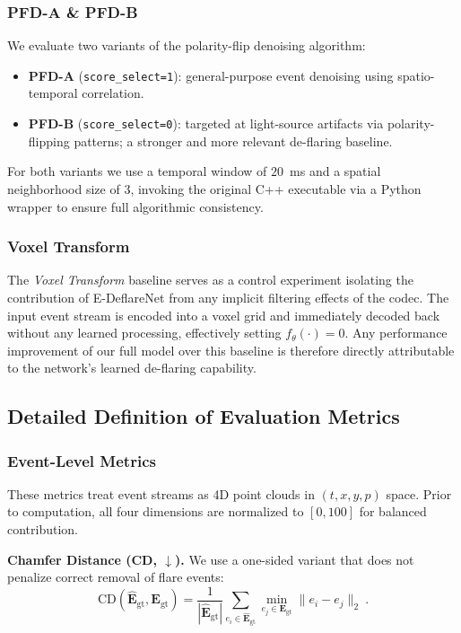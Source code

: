     \subsubsection{PFD-A \& PFD-B~\cite{shi2024polarity}}
    We evaluate two variants of the polarity-flip denoising algorithm:
    \begin{itemize}
        \item \textbf{PFD-A} (\texttt{score\_select=1}): general-purpose event denoising using spatio-temporal correlation.
        \item \textbf{PFD-B} (\texttt{score\_select=0}): targeted at light-source artifacts via polarity-flipping patterns; a stronger and more relevant de-flaring baseline.
    \end{itemize}
    For both variants we use a temporal window of $20$~ms and a spatial neighborhood size of $3$, invoking the original C++ executable via a Python wrapper to ensure full algorithmic consistency.

    \subsubsection{Voxel Transform}
    The \emph{Voxel Transform} baseline serves as a control experiment isolating the contribution of E-DeflareNet from any implicit filtering effects of the codec. The input event stream is encoded into a voxel grid and immediately decoded back without any learned processing, effectively setting $f_{\theta}(\cdot) = 0$. Any performance improvement of our full model over this baseline is therefore directly attributable to the network's learned de-flaring capability.

\subsection{Detailed Definition of Evaluation Metrics}
\label{app:metrics_details}

    \subsubsection{Event-Level Metrics}
    These metrics treat event streams as 4D point clouds in $(t, x, y, p)$ space. Prior to computation, all four dimensions are normalized to $[0, 100]$ for balanced contribution.

    \noindent\textbf{Chamfer Distance (CD, $\downarrow$).}
    We use a one-sided variant that does not penalize correct removal of flare events:
    \begin{equation}
        \mathrm{CD}(\hat{\mathbf{E}}_{\mathrm{gt}}, \mathbf{E}_{\mathrm{gt}}) = \frac{1}{|\hat{\mathbf{E}}_{\mathrm{gt}}|} \sum_{e_i \in \hat{\mathbf{E}}_{\mathrm{gt}}} \min_{e_j \in \mathbf{E}_{\mathrm{gt}}} \| e_i - e_j \|_2~.
    \end{equation}

